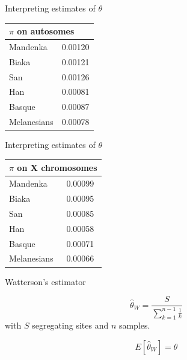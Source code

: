 \begin{frame}{Interpreting estimates of $\theta$}

	\begin{table}[h]
                \centering
                \begin{tabular}{p{} p{}}
                        \toprule
                        \multicolumn{2}{p{0.9\textwidth}}{$\pi$ on autosomes} \\
                        \midrule
                        Mandenka    & 0.00120 \\
                        Biaka       & 0.00121 \\
			San & 0.00126 \\
                        Han & 0.00081 \\
			Basque & 0.00087 \\
			Melanesians & 0.00078 \\
                        \bottomrule
                \end{tabular}
        \end{table}

\end{frame}


\begin{frame}{Interpreting estimates of $\theta$}

        \begin{table}[h]
                \centering
                \begin{tabular}{p{} p{}}
                        \toprule
                        \multicolumn{2}{p{0.9\textwidth}}{$\pi$ on X chromosomes} \\
                        \midrule
                        Mandenka    & 0.00099 \\
                        Biaka       & 0.00095 \\
                        San & 0.00085 \\
                        Han & 0.00058 \\
                        Basque & 0.00071 \\
                        Melanesians & 0.00066 \\
                        \bottomrule
                \end{tabular}
        \end{table}

\end{frame}


\begin{frame}{Watterson's estimator}

	\begin{equation}
		\hat{\theta}_W = \frac{S}{\sum_{k=1}^{n-1} \frac{1}{k}}
	\end{equation}
	with $S$ segregating sites and $n$ samples.

	\begin{equation}
		E[\hat{\theta}_W] = \theta
	\end{equation}

\end{frame}


